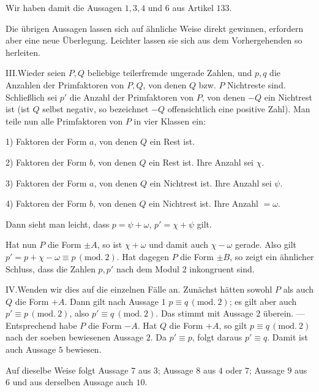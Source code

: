 Wir haben damit die Aussagen $1,3,4$ und $6$ aus Artikel $133$.

Die übrigen Aussagen lassen sich auf ähnliche Weise direkt gewinnen, erfordern aber eine neue Überlegung. Leichter lassen sie sich aus dem Vorhergehenden so herleiten.

III.\quad Wieder seien $P,Q$ beliebige teilerfremde ungerade Zahlen, und $p,q$ die Anzahlen der Primfaktoren von $P,Q$, von denen $Q$ bzw. $P$ Nichtreste sind. Schließlich sei $p'$ die Anzahl der Primfaktoren von $P$, von denen $-Q$ ein Nichtrest ist (ist $Q$ selbst negativ, so bezeichnet $-Q$ offensichtlich eine positive Zahl). Man teile nun alle Primfaktoren von $P$ in vier Klassen ein:

1) Faktoren der Form $a$, von denen $Q$ ein Rest ist.

2) Faktoren der Form $b$, von denen $Q$ ein Rest ist. Ihre Anzahl sei $\chi$.

3) Faktoren der Form $a$, von denen $Q$ ein Nichtrest ist. Ihre Anzahl sei $\psi$.

4) Faktoren der Form $b$, von denen $Q$ ein Nichtrest ist. Ihre Anzahl $=\omega$.

Dann sieht man leicht, dass $p=\psi+\omega$, $p'=\chi+\psi$ gilt.

Hat nun $P$ die Form $\pm A$, so ist $\chi+\omega$ und damit auch $\chi-\omega$ gerade. Also gilt $p'=p+\chi-\omega\equiv p\, (\mathrm{mod.}\ 2)$. Hat dagegen $P$ die Form $\pm B$, so zeigt ein ähnlicher Schluss, dass die Zahlen $p,p'$ nach dem Modul $2$ inkongruent sind.

IV.\quad Wenden wir dies auf die einzelnen Fälle an. Zunächst hätten sowohl $P$ als auch $Q$ die Form $+A$. Dann gilt nach Aussage $1$ $p\equiv q\, (\mathrm{mod.}\ 2)$; es gilt aber auch $p'\equiv p\, (\mathrm{mod.}\ 2)$, also $p'\equiv q\ (\mathrm{mod.}\ 2)$. Das stimmt mit Aussage $2$ überein. --- Entsprechend habe $P$ die Form $-A$. Hat $Q$ die Form $+A$, so gilt $p\equiv q\, (\mathrm{mod.}\ 2)$ nach der soeben bewiesenen Aussage $2$. Da $p'\equiv p$, folgt daraus $p'\equiv q$. Damit ist auch Aussage $5$ bewiesen.

Auf dieselbe Weise folgt Aussage $7$ aus $3$; Aussage $8$ aus $4$ oder $7$; Aussage $9$ aus $6$ und aus derselben Aussage auch $10$.
